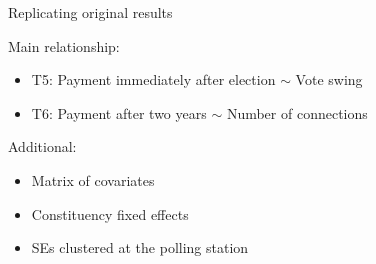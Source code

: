 \documentclass[10pt,table,aspectratio=169]{beamer}
\begin{document}
\begin{frame}[plain, label = two_dimensions]{Replicating original results}

Main relationship:

\begin{itemize}
  \item T5: Payment immediately after election $\sim$ Vote swing
  \item T6: Payment after two years $\sim$ Number of connections
\end{itemize}

Additional:

\begin{itemize}
  \item Matrix of covariates
  \item Constituency fixed effects
  \item SEs clustered at the polling station
\end{itemize}


\end{frame}
\end{document}
